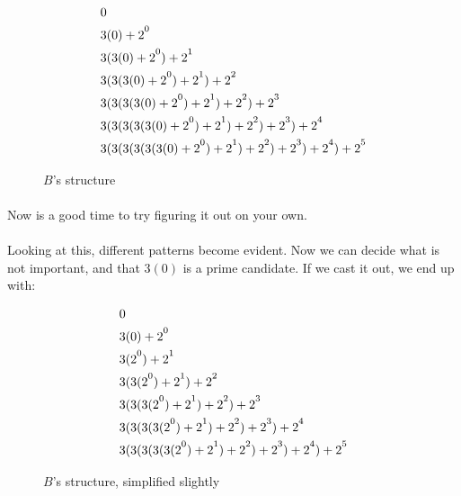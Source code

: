 \documentclass[12pt,letterpaper]{article}
\begin{document}
			\begin{figure}[h]
				\begin{align*}
					&0 \\
					&3(0) + 2\strut^0\\
					&3(3(0) + 2\strut^0) + 2\strut^1\\
					&3(3(3(0) + 2\strut^0) + 2\strut^1) + 2\strut^2\\
					&3(3(3(3(0) + 2\strut^0) + 2\strut^1) + 2\strut^2) + 2\strut^3\\
					&3(3(3(3(3(0) + 2\strut^0) + 2\strut^1) + 2\strut^2) + 2\strut^3) + 2\strut^4\\
					&3(3(3(3(3(3(0) + 2\strut^0) + 2\strut^1) + 2\strut^2) + 2\strut^3) + 2\strut^4) + 2\strut^5
				\end{align*}
				
				\caption{$B$'s structure}
			\end{figure}
		
			\paragraph{} Now is a good time to try figuring it out on your own.
			
			\paragraph{} Looking at this, different patterns become evident. Now we can decide what is not important, and that $3(0)$ is a prime candidate. If we cast it out, we end up with:
			
			\begin{figure}[h]
				\begin{align*}
				&0 \\
				&3(0) + 2\strut^0\\
				&3(2\strut^0) + 2\strut^1\\
				&3(3(2\strut^0) + 2\strut^1) + 2\strut^2\\
				&3(3(3(2\strut^0) + 2\strut^1) + 2\strut^2) + 2\strut^3\\
				&3(3(3(3(2\strut^0) + 2\strut^1) + 2\strut^2) + 2\strut^3) + 2\strut^4\\
				&3(3(3(3(3(2\strut^0) + 2\strut^1) + 2\strut^2) + 2\strut^3) + 2\strut^4) + 2\strut^5
				\end{align*}
				
				\caption{$B$'s structure, simplified slightly}
			\end{figure}
			\newpage %
		
\end{document}
